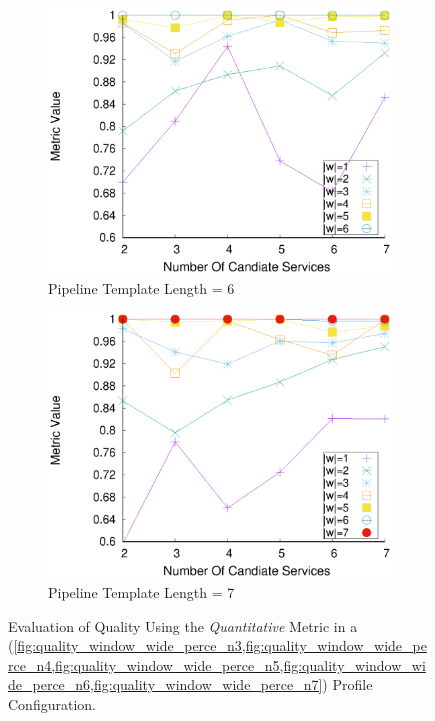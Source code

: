 \begin{figure}[ht!]
\begin{subfigure}{0.49\textwidth}
        \label{fig:quality_window_wide_perce_n5}
      \end{subfigure}
      \hfill
      \begin{subfigure}{0.49\textwidth}
        \includegraphics[width=\textwidth]{Images/graphs/window_quality_performance_diff_perce_n7_s7_20_100_n6}
        \caption{Pipeline Template Length = 6}
        \label{fig:quality_window_wide_perce_n6}
      \end{subfigure}
      \hfill
      \begin{subfigure}{0.49\textwidth}
        \includegraphics[width=\textwidth]{Images/graphs/window_quality_performance_diff_perce_n7_s7_20_100_n7}
        \caption{Pipeline Template Length = 7}
        \label{fig:quality_window_wide_perce_n7}
      \end{subfigure}

      \caption{Evaluation of Quality Using the \emph{Quantitative} Metric in a \wide (\cref{fig:quality_window_wide_perce_n3,fig:quality_window_wide_perce_n4,fig:quality_window_wide_perce_n5,fig:quality_window_wide_perce_n6,fig:quality_window_wide_perce_n7}) Profile Configuration.}
      \label{fig:quality_window_perce_wide}

    \end{figure}

